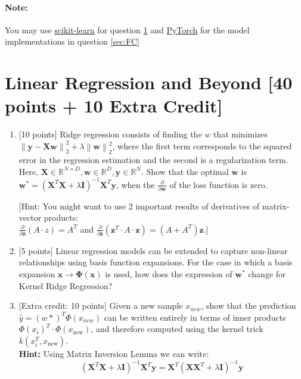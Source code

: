 \documentclass[letterpaper]{article}
\newcommand{\deriv}[1]{\frac{\partial}{\partial {#1}} }
\newcommand{\mbf}[1]{{\mathbf{#1}}}
\begin{document}
\paragraph*{Note:} You may use \underline{scikit-learn} for question \ref{sec:linear} and \underline{PyTorch} for the model implementations in question \ref{sec:FC}  \\
\section{Linear Regression and Beyond [40 points + 10 Extra Credit]}
\label{sec:linear}

\begin{enumerate}
   
    \item {[10 points]} Ridge regression consists of finding the $w$ that minimizes $\left\|\mbf{y}-\mbf{X}\mathbf{w} \right\|_{2}^2 + \lambda \left\|\mbf{w}\right\| _{2}^2$, where the first term corresponds to the squared error in the regression estimation and the second is a regularization term. Here, $\mbf X\in\mathbb{R}^{N\times D}, \mbf w \in \mathbb{R}^D, \mbf y \in \mathbb{R}^N$. Show that the optimal $\mathbf{w}$ is $\mbf{w}^{*}=(\mbf{X}^T \mbf{X} + \lambda \mbf{I})^{-1} \mbf{X}^T \mbf{y}$, when the $\frac{\partial}{\partial \mbf{w}}$ of the loss function is zero.
    
    [Hint: You might want to use 2 important results of derivatives of matrix-vector products: \\$\deriv{\mbf z} (A\cdot z) = A^T$ and $\deriv{\mbf z} (\mbf z^T \cdot A \cdot \mbf z) = (A+A^T) \mbf z$.]
    
  
    \item {[5 points]} Linear regression models can be extended to capture non-linear relationships using basis function expansions. For the case in which a basis expansion $\mbf{x} \to \mbf{\Phi (x)}$ is used, how does the expression of $\mbf{w}^{*}$ change for Kernel Ridge Regression?\\
    
    \item {[Extra credit: 10 points]} Given a new sample $x_{new}$, show that the prediction $\hat{y} = (w*)^{T} \Phi(x_{new})$ can be written entirely in terms of inner products $\Phi (x_{i})^{T} \cdot \Phi (x_{\text{new}})$, and therefore computed using the kernel trick $k(x_{i}^{T}, x_{\text{new}})$.\\
    \textbf{Hint:} Using Matrix Inversion Lemma we can write: $$(\mathbf{X}^T \mathbf{X} + \lambda \mathbf{I})^{-1} \mathbf{X}^T \mathbf{y} = \mathbf{X}^T (\mathbf{X} \mathbf{X}^T + \lambda \mathbf{I})^{-1} \mathbf{y}$$
    


\end{enumerate}
\end{document}
